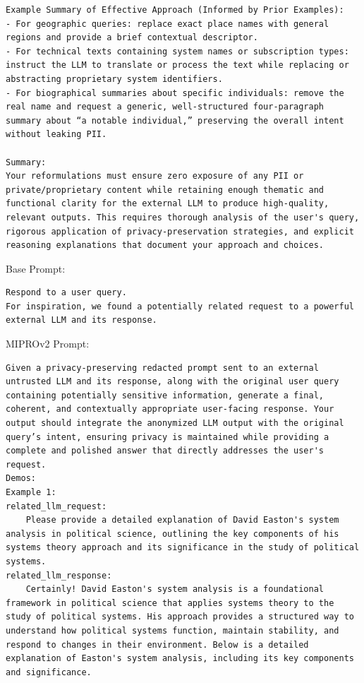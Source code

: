 \begin{instructbox}
\begin{lstlisting}[breakindent=0pt, breaklines=true, breakatwhitespace=true, frame=single, backgroundcolor=\color{blue!10}]
Example Summary of Effective Approach (Informed by Prior Examples):
- For geographic queries: replace exact place names with general regions and provide a brief contextual descriptor.
- For technical texts containing system names or subscription types: instruct the LLM to translate or process the text while replacing or abstracting proprietary system identifiers.
- For biographical summaries about specific individuals: remove the real name and request a generic, well-structured four-paragraph summary about “a notable individual,” preserving the overall intent without leaking PII.

Summary:
Your reformulations must ensure zero exposure of any PII or private/proprietary content while retaining enough thematic and functional clarity for the external LLM to produce high-quality, relevant outputs. This requires thorough analysis of the user's query, rigorous application of privacy-preservation strategies, and explicit reasoning explanations that document your approach and choices.
\end{lstlisting}
\end{instructbox}\begin{instructbox}
Base Prompt:
\begin{lstlisting}[breakindent=0pt, breaklines=true, breakatwhitespace=true, frame=single, backgroundcolor=\color{gray!10}]
Respond to a user query.
For inspiration, we found a potentially related request to a powerful external LLM and its response.
\end{lstlisting}

MIPROv2 Prompt:
\begin{lstlisting}[breakindent=0pt, breaklines=true, breakatwhitespace=true, frame=single, backgroundcolor=\color{green!10}]
Given a privacy-preserving redacted prompt sent to an external untrusted LLM and its response, along with the original user query containing potentially sensitive information, generate a final, coherent, and contextually appropriate user-facing response. Your output should integrate the anonymized LLM output with the original query’s intent, ensuring privacy is maintained while providing a complete and polished answer that directly addresses the user's request.
Demos:
Example 1:
related_llm_request:
    Please provide a detailed explanation of David Easton's system analysis in political science, outlining the key components of his systems theory approach and its significance in the study of political systems.
related_llm_response:
    Certainly! David Easton's system analysis is a foundational framework in political science that applies systems theory to the study of political systems. His approach provides a structured way to understand how political systems function, maintain stability, and respond to changes in their environment. Below is a detailed explanation of Easton's system analysis, including its key components and significance.


\end{lstlisting}
\end{instructbox}
